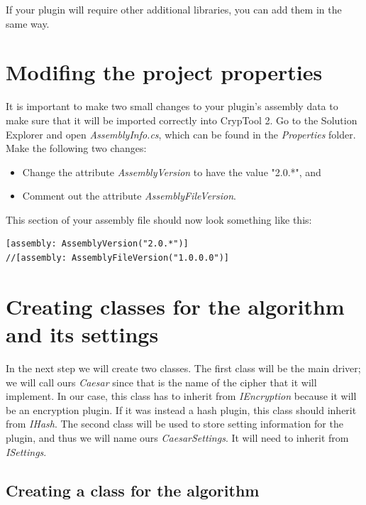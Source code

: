 \noindent If your plugin will require other additional libraries, you can add them in the same way.

\section{Modifing the project properties}
\label{sec:ModifyTheProjectProperties}

It is important to make two small changes to your plugin's assembly data to make sure that it will be imported correctly into CrypTool 2. Go to the Solution Explorer and open \textit{AssemblyInfo.cs}, which can be found in the \textit{Properties} folder. Make the following two changes:

\begin{itemize}
	\item Change the attribute \textit{AssemblyVersion} to have the value "2.0.*", and
	\item Comment out the attribute \textit{AssemblyFileVersion}.
\end{itemize}

\noindent This section of your assembly file should now look something like this:

\begin{lstlisting}
[assembly: AssemblyVersion("2.0.*")]
//[assembly: AssemblyFileVersion("1.0.0.0")]
\end{lstlisting}

\section{Creating classes for the algorithm and its settings}
\label{sec:CreatingClassesForTheAlgorithmAndItsSettings}

In the next step we will create two classes. The first class will be the main driver; we will call ours \textit{Caesar} since that is the name of the cipher that it will implement. In our case, this class has to inherit from \textit{IEncryption} because it will be an encryption plugin. If it was instead a hash plugin, this class should inherit from \textit{IHash}. The second class will be used to store setting information for the plugin, and thus we will name ours \textit{CaesarSettings}. It will need to inherit from \textit{ISettings}.
\clearpage

\subsection{Creating a class for the algorithm}
\label{sec:CreatingAClassForTheAlgorithm}

